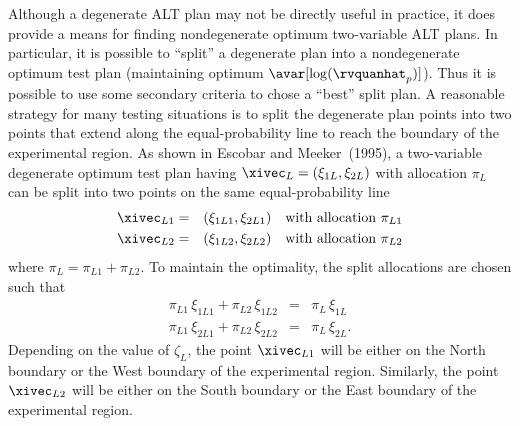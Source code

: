 Although a degenerate ALT plan may not be directly useful in
practice, it does provide a means for finding nondegenerate optimum
two-variable ALT plans.  In particular, it is possible to ``split''
a degenerate plan into a nondegenerate optimum test plan
(maintaining optimum $\avar[\log(\rvquanhat_{p})]$).  Thus it is possible to
use some secondary criteria to chose a ``best'' split plan. A
reasonable strategy for many testing situations is to split the
degenerate plan points into two points that extend along the
equal-probability line to reach the boundary of the experimental
region. As shown in Escobar and Meeker~(1995), a two-variable
degenerate optimum test plan having $\xivec_{L}=(\xi_{1L},\xi_{2L})$
with allocation $\pi_{L}$ can be split into two points on the same
equal-probability line
\begin{eqnarray*} 
\xivec_{L1} &=& (\xi_{1L1},\xi_{2L1})\quad\text{with allocation } \pi_{L1}\\
\xivec_{L2} &=& (\xi_{1L2},\xi_{2L2})\quad\text{with allocation } \pi_{L2}
\end{eqnarray*}
where $\pi_{L}=\pi_{L1}+\pi_{L2}$. To
maintain the optimality, the split allocations are chosen such that
\begin{eqnarray} 
\label{equation:tvalt.splitL}
\pi_{L1} \, \xi_{1L1} + \pi_{L2} \, \xi_{1L2} &=& \pi_{L} \, \xi_{1L}\\
\nonumber
\pi_{L1} \, \xi_{2L1} + \pi_{L2} \, \xi_{2L2} &=& \pi_{L} \, \xi_{2L}.
\end{eqnarray}
Depending on the value of $\zeta_{L}$, the point $\xivec_{L1}$ will
be either on the North boundary or the West boundary of the
experimental region. Similarly, the point $\xivec_{L2}$ will be
either on the South boundary or the East boundary of the
experimental region.

